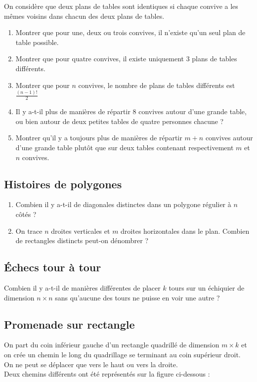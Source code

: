 \documentclass[oneside,12pt]{book}          %
\begin{document}
On considère que deux plans de tables sont identiques si chaque convive a les mêmes voisins dans chacun des deux plans de tables.
\begin{enumerate}
    \item Montrer que pour une, deux ou trois convives, il n'existe qu'un seul plan de table possible.
    \item Montrer que pour quatre convives, il existe uniquement 3 plans de tables différents.
    \item Montrer que pour $n$ convives, le nombre de plans de tables différents est $\frac{(n-1)!}{2}$
    \item Il y a-t-il plus de manières de répartir 8 convives autour d'une grande table, ou bien autour de deux petites tables de quatre personnes chacune ?
    \item Montrer qu'il y a toujours plus de manières de répartir $m+n$ convives autour d'une grande table plutôt que sur deux tables contenant respectivement $m$ et $n$ convives.
\end{enumerate}



\subsection{Histoires de polygones}
\begin{enumerate}
    \item Combien il y a-t-il de diagonales distinctes dans un polygone régulier à $n$ côtés ?
    \item On trace $n$ droites verticales et $m$ droites horizontales dans le plan. Combien de rectangles distincts peut-on dénombrer ?
\end{enumerate}



\subsection{Échecs tour à tour}
Combien il y a-t-il de manières différentes de placer $k$ tours sur un échiquier de dimension $n\times n$ sans qu'aucune des tours ne puisse en voir une autre ?



\subsection{Promenade sur rectangle}

On part du coin inférieur gauche d'un rectangle quadrillé de dimension $m\times k$ et on crée un chemin le long du quadrillage se terminant au coin supérieur droit.\\
On ne peut se déplacer que vers le haut ou vers la droite.\\[5pt]
Deux chemins différents ont été représentés sur la figure ci-dessous :
\end{document}
